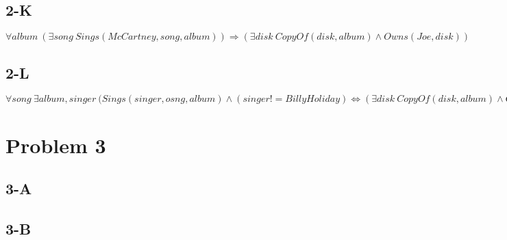 \documentclass{article}
\begin{document}
        \subsection{2-K}
            $\forall album\: (\exists song\: Sings(McCartney, song, album))\Rightarrow(\exists disk\: CopyOf(disk, album)\land Owns(Joe, disk))$
        \subsection{2-L}
            $\forall song\: \exists album, singer\: (Sings(singer, osng, album)\land(singer!=Billy Holiday) \Leftrightarrow (\exists disk\: CopyOf(disk, album)\land Owns(Joe, disk))$
    \section{Problem 3}
        \subsection{3-A}
        \subsection{3-B}
\end{document}
